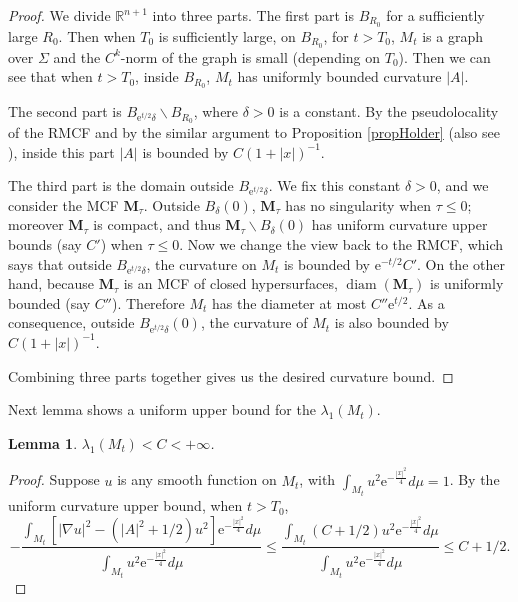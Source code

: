 \documentclass[12pt]{amsart}
\numberwithin{equation}{section}
\newtheorem{lemma}[theorem]{Lemma}
\numberwithin{equation}{section}
\newcommand{\R}{\mathbb{R}}
\DeclareMathOperator{\diam}{diam}
\begin{document}
	\begin{proof}
		We divide $\R^{n+1}$ into three parts. The first part is $B_{R_0}$ for a sufficiently large $R_0$. Then when $T_0$ is sufficiently large, on $B_{R_0}$, for $t>T_0$, $M_t$ is a graph over $\Sigma$ and the $C^{k}$-norm of the graph is small (depending on $T_0$). Then we can see that when $t>T_0$, inside $B_{R_0}$, $M_t$ has uniformly bounded curvature $|A|$.
		
		The second part is $B_{\mathrm{e}^{t/2}\delta}\backslash B_{R_0}$, where $\delta>0$ is a constant. By the pseudolocality of the RMCF and by the similar argument to Proposition \ref{propHolder} (also see \cite[Section 9]{CS}), inside this part $|A|$ is bounded by $C(1+|x|)^{-1}$. 
		
		The third part is the domain outside $B_{\mathrm{e}^{t/2}\delta}$. We fix this constant $\delta>0$, and we consider the MCF $\mathbf{M}_\tau$. Outside $B_\delta(0)$, $\mathbf{M}_\tau$ has no singularity when $\tau\leq 0$; moreover $\mathbf{M}_\tau$ is compact, and thus $\mathbf{M}_\tau\backslash B_\delta(0)$ has uniform curvature upper bounds (say $C'$) when $\tau\leq 0$. Now we change the view back to the RMCF, which says that outside $B_{\mathrm{e}^{t/2}\delta}$, the curvature on $M_t$ is bounded by $\mathrm{e}^{-t/2}C'$. On the other hand, because $\mathbf{M}_\tau$ is an MCF of closed hypersurfaces, $\diam(\mathbf{M}_\tau)$ is uniformly bounded (say $C''$). Therefore $M_t$ has the diameter at most $C''\mathrm{e}^{t/2}$. As a consequence, outside $B_{\mathrm{e}^{t/2}\delta}(0)$, the curvature of $M_t$ is also bounded by $C(1+|x|)^{-1}$.
		
		Combining three parts together gives us the desired curvature bound.
	\end{proof}
	
	Next lemma shows a uniform upper bound for the $\lambda_1(M_t)$.
	
	\begin{lemma}
		$\lambda_1(M_t)<C<+\infty$.
	\end{lemma}
	
	\begin{proof}
		Suppose $u$ is any smooth function on $M_t$, with $\int_{M_t}u^2 \mathrm{e}^{-\frac{|x|^2}{4}}d\mu =1$. By the uniform curvature upper bound, when $t>T_0$,
		\begin{equation*}
			-\frac{\int_{M_t}[|\nabla u|^2 -(|A|^2+1/2)u^2]\mathrm{e}^{-\frac{|x|^2}{4}}d\mu}{\int_{M_t}u^2\mathrm{e}^{-\frac{|x|^2}{4}}d\mu}\leq
			\frac{\int_{M_t}(C+1/2)u^2 \mathrm{e}^{-\frac{|x|^2}{4}}d\mu}{{\int_{M_t}u^2\mathrm{e}^{-\frac{|x|^2}{4}}d\mu}}\leq C+1/2.
		\end{equation*}
	\end{proof}
	
\end{document}
